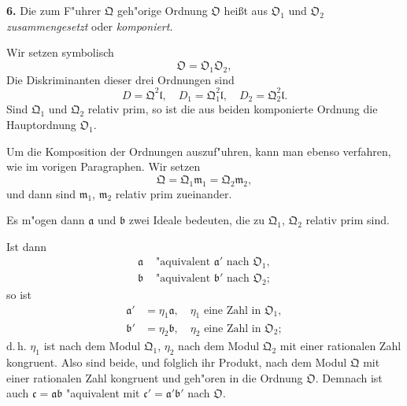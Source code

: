 \documentclass[12pt,a4paper]{article}
\theoremstyle{plain}
\begin{document}
\textbf{6.} Die zum F"uhrer $\mathfrak{Q}$ geh"orige Ordnung $\mathfrak{O}$ hei\ss t aus $\mathfrak{O}_1$ und $\mathfrak{O}_2$ \textit{zusammengesetzt} oder \textit{komponiert}.

Wir setzen symbolisch
\begin{equation}
\mathfrak{O} = \mathfrak{O}_1\mathfrak{O}_2,
\tag{2}
\end{equation}
Die Diskriminanten dieser drei Ordnungen sind
\begin{equation}
D = \mathfrak{Q}^2\mathfrak{l},\quad D_1 = \mathfrak{Q}_1^2\mathfrak{l},\quad D_2 = \mathfrak{Q}_2^2\mathfrak{l}.
\tag{3}
\end{equation}
Sind $\mathfrak{Q}_1$ und $\mathfrak{Q}_2$ relativ prim, so ist die aus beiden komponierte Ordnung die Hauptordnung $\mathfrak{O}_1$.

Um die Komposition der Ordnungen auszuf"uhren, kann man ebenso verfahren, wie im vorigen Paragraphen. Wir setzen
\begin{equation}
\mathfrak{Q} = \mathfrak{Q}_1\mathfrak{m}_1 = \mathfrak{Q}_2\mathfrak{m}_2,
\tag{4}
\end{equation}
und dann sind $\mathfrak{m}_1$, $\mathfrak{m}_2$ relativ prim zueinander.

Es m"ogen dann $\mathfrak{a}$ und $\mathfrak{b}$ zwei Ideale bedeuten, die zu $\mathfrak{Q}_1$, $\mathfrak{Q}_2$ relativ prim sind.

Ist dann
\begin{align*}
\mathfrak{a} &\text{ "aquivalent } \mathfrak{a}' \text{ nach } \mathfrak{O}_1,\\
\mathfrak{b} &\text{ "aquivalent } \mathfrak{b}' \text{ nach } \mathfrak{O}_2;
\end{align*}
so ist
\begin{align*}
\mathfrak{a}' &= \eta_1\mathfrak{a},\quad \eta_1 \text{ eine Zahl in } \mathfrak{O}_1,\\
\mathfrak{b}' &= \eta_2\mathfrak{b},\quad \eta_2 \text{ eine Zahl in } \mathfrak{O}_2;
\end{align*}
d.\,h. $\eta_1$ ist nach dem Modul $\mathfrak{Q}_1$, $\eta_2$ nach dem Modul $\mathfrak{Q}_2$ mit einer rationalen Zahl kongruent. Also sind beide, und folglich ihr Produkt, nach dem Modul $\mathfrak{Q}$ mit einer rationalen Zahl kongruent und geh"oren in die Ordnung $\mathfrak{O}$. Demnach ist auch $\mathfrak{c} = \mathfrak{a}\mathfrak{b}$ "aquivalent mit $\mathfrak{c}' = \mathfrak{a}'\mathfrak{b}'$ nach $\mathfrak{O}$.
\end{document}
